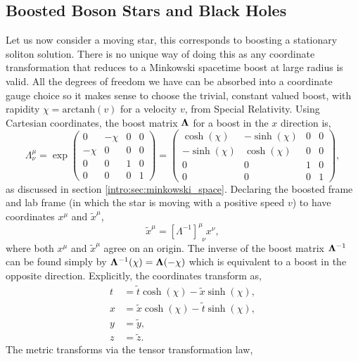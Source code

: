 \subsection{Boosted Boson Stars and Black Holes}\label{boson:sec:boost}
Let us now consider a moving star, this corresponds to boosting a stationary soliton solution. There is no unique way of doing this as any coordinate transformation that reduces to a Minkowski spacetime boost at large radius is valid. All the degrees of freedom we have can be absorbed into a coordinate gauge choice so it makes sense to choose the trivial, constant valued boost, with rapidity $\chi = \mathrm{arctanh} (v)$ for a velocity $v$, from Special Relativity. Using Cartesian coordinates, the boost matrix $\boldsymbol{\Lambda}$ for a boost in the $x$ direction is,
\begin{equation}
\Lambda_\nu^\mu =  \exp\begin{pmatrix} 0 & -\chi & 0& 0 \\ -\chi & 0 & 0 & 0\\ 0 & 0&1&0 \\ 0&0&0&1\end{pmatrix} = \begin{pmatrix} \cosh(\chi) & -\sinh(\chi) & 0& 0 \\ -\sinh(\chi) & \cosh(\chi) & 0 & 0\\ 0 & 0&1&0 \\ 0&0&0&1\end{pmatrix},
\end{equation}
as discussed in section \ref{intro:sec:minkowski_space}. Declaring the boosted frame and lab frame (in which the star is moving with a positive speed $v$) to have coordinates $x^\mu$ and $\tilde{x}^\mu$, 
\begin{equation}
\tilde{x}^\mu = [\Lambda^{-1}]^{\mu}_{\,\,\,\nu}x^{\nu},
\end{equation}
where both $x^\mu$ and $\tilde{x}^\mu$ agree on an origin. The inverse of the boost matrix $\boldsymbol{\Lambda}^{-1}$ can be found simply by $\boldsymbol{\Lambda}^{-1}(\chi) = \boldsymbol{\Lambda}(-\chi)$ which is equivalent to a boost in the opposite direction. Explicitly, the coordinates transform as,
\begin{align}
 t &= \tilde{t}\cosh(\chi) - \tilde{x} \sinh(\chi),\\
 x &= \tilde{x}\cosh(\chi)-\tilde{t}\sinh(\chi),\\
 y &= \tilde{y},\\
 z &= \tilde{z} .
\end{align}
The metric transforms via the tensor transformation law,
